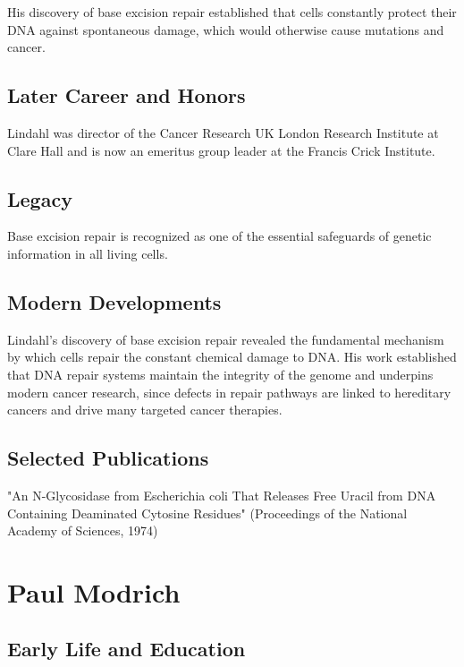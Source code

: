 His discovery of base excision repair established that cells constantly protect their DNA against spontaneous damage, which would otherwise cause mutations and cancer.

\subsection*{Later Career and Honors}

Lindahl was director of the Cancer Research UK London Research Institute at Clare Hall and is now an emeritus group leader at the Francis Crick Institute.

\subsection*{Legacy}

Base excision repair is recognized as one of the essential safeguards of genetic information in all living cells.

\subsection*{Modern Developments}

Lindahl's discovery of base excision repair revealed the fundamental mechanism by which cells repair the constant chemical damage to DNA. His work established that DNA repair systems maintain the integrity of the genome and underpins modern cancer research, since defects in repair pathways are linked to hereditary cancers and drive many targeted cancer therapies.

\subsection*{Selected Publications}

"An N-Glycosidase from Escherichia coli That Releases Free Uracil from DNA Containing Deaminated Cytosine Residues" (Proceedings of the National Academy of Sciences, 1974)

\clearpage

\section{Paul Modrich}

\subsection*{Early Life and Education}

